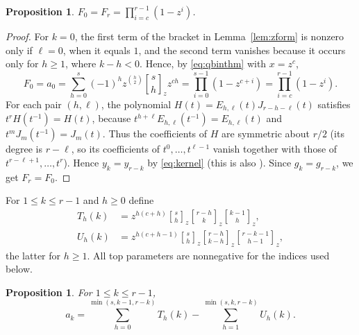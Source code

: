 \documentclass{amsart}
\newtheorem{proposition}[theorem]{Proposition}
\theoremstyle{remark}
\numberwithin{equation}{section}
\newcommand{\qbinom}[3]{\genfrac{[}{]}{0pt}{}{#1}{#2}_{#3}}
\begin{document}
\begin{proposition}\label{prop:endpoint}
$F_0=F_r=\prod_{i=c}^{r-1}(1-z^i)$.
\end{proposition}

\begin{proof}
For $k=0$, the first term of the bracket in Lemma~\ref{lem:zform} is nonzero only if $\ell=0$, when it equals $1$, and the second term vanishes because it occurs only for $h\ge1$, where $k-h<0$. Hence, by \eqref{eq:qbinthm} with $x=z^c$,
\[
  F_0=a_0=\sum_{h=0}^{s}(-1)^hz^{\binom h2}\qbinom{s}{h}{z}z^{ch}=\prod_{i=0}^{s-1}(1-z^{c+i})=\prod_{i=c}^{r-1}(1-z^i).
\]
For each pair $(h,\ell)$, the polynomial $H(t)=E_{h,\ell}(t)J_{r-h-\ell}(t)$ satisfies $t^rH(t^{-1})=H(t)$, because $t^{h+\ell}E_{h,\ell}(t^{-1})=E_{h,\ell}(t)$ and $t^{m}J_m(t^{-1})=J_m(t)$. Thus the coefficients of $H$ are symmetric about $r/2$ (its degree is $r-\ell$, so its coefficients of $t^0,\dots,t^{\ell-1}$ vanish together with those of $t^{r-\ell+1},\dots,t^r$). Hence $y_k=y_{r-k}$ by \eqref{eq:kernel} (this is also \cite[Lemma~2.2]{GRX}). Since $g_k=g_{r-k}$, we get $F_r=F_0$.
\end{proof}

For $1\le k\le r-1$ and $h\ge0$ define
\begin{align*}
  T_h(k)&=z^{h(c+h)}\qbinom{s}{h}{z}\qbinom{r-h}{k}{z}\qbinom{k-1}{h}{z},\\
  U_h(k)&=z^{h(c+h-1)}\qbinom{s}{h}{z}\qbinom{r-h}{k-h}{z}\qbinom{r-k-1}{h-1}{z},
\end{align*}
the latter for $h\ge1$. All top parameters are nonnegative for the indices used below.

\begin{proposition}\label{prop:TU}
For $1\le k\le r-1$,
\[
  a_k=\sum_{h=0}^{\min(s,k-1,r-k)}T_h(k)-\sum_{h=1}^{\min(s,k,r-k)}U_h(k).
\]
\end{proposition}
\end{document}
